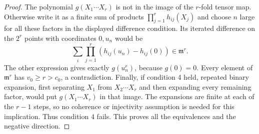 \begin{proof}
The polynomial $g(X_1\cdots X_r)$ is not in the image of the
$r$-fold tensor map. Otherwise write it as a finite sum of
products $\prod_{j=1}^r h_{ij}(X_j)$ and choose $n$ large for
all these factors in the displayed difference condition.
Its iterated difference on the $2^r$ points with coordinates
$0,u_n$ would be
\[
 \sum_i\prod_{j=1}^r(h_{ij}(u_n)-h_{ij}(0))\in\mathfrak m^r.
\]
The other expression gives exactly $g(u_n^r)$, because $g(0)=0$.
Every element of $\mathfrak m^r$ has $v_0\ge r>c_0$, a
contradiction. Finally, if condition 4 held, repeated binary
expansion, first separating $X_1$ from $X_2\cdots X_r$ and
then expanding every remaining factor, would put
$g(X_1\cdots X_r)$ in that image. The expansions are finite at
each of the $r-1$ steps, so no coherence or injectivity assumption
is needed for this implication. Thus condition 4 fails.
This proves all the equivalences and the negative direction.
\end{proof}

